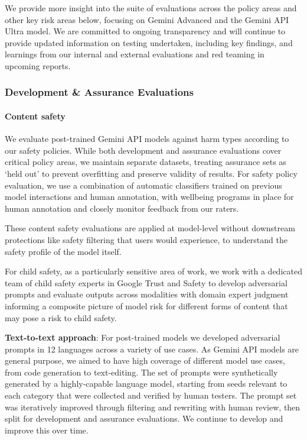 We provide more insight into the suite of evaluations across the policy areas and other key risk areas below, focusing on Gemini Advanced and the Gemini API Ultra model. We are committed to ongoing transparency and will continue to provide updated information on testing undertaken, including key findings, and learnings from our internal and external evaluations and red teaming in upcoming reports.  

\subsubsection{Development \& Assurance Evaluations}

\paragraph{Content safety}

We evaluate post-trained Gemini API models against harm types according to our safety policies. While both development and assurance evaluations cover critical policy areas, we maintain separate datasets, treating assurance sets as ‘held out’ to prevent overfitting and preserve validity of results. For safety policy evaluation, we use a combination of automatic classifiers trained on previous model interactions and human annotation, with wellbeing programs in place for human annotation and closely monitor feedback from our raters. 

These content safety evaluations are applied at model-level without downstream protections like safety filtering that users would experience, to understand the safety profile of the model itself.

For child safety, as a particularly sensitive area of work, we work with a dedicated team of child safety experts in Google Trust and Safety to develop adversarial prompts and evaluate outputs across modalities with domain expert judgment informing a composite picture of model risk for different forms of content that may pose a risk to child safety.


\textbf{Text-to-text approach}: For post-trained models we developed adversarial prompts in 12 languages across a variety of use cases. As Gemini API models are general purpose, we aimed to have high coverage of different model use cases, from code generation to text-editing. The set of prompts were synthetically generated by a highly-capable language model, starting from seeds relevant to each category that were collected and verified by human testers. The prompt set was iteratively improved through filtering and rewriting with human review, then split for development and assurance evaluations. We continue to develop and improve this over time.

